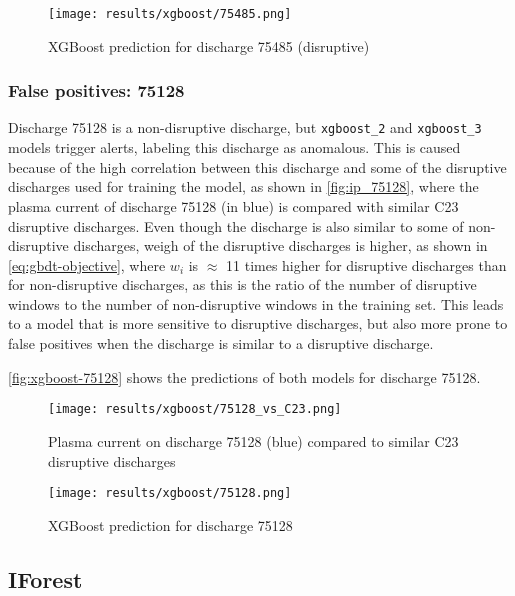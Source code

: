 \begin{figure}[H]
    \centering
    \texttt{[image: results/xgboost/75485.png]}
    \caption{XGBoost prediction for discharge 75485 (disruptive)}
    \label{fig:xgboost-75485}
\end{figure}

\subsubsection{False positives: 75128}

Discharge 75128 is a non-disruptive discharge, but \texttt{xgboost\_2} and \texttt{xgboost\_3} models trigger alerts, labeling this discharge as anomalous. This is caused because of the high correlation between this discharge and some of the disruptive discharges used for training the model, as shown in \autoref{fig:ip_75128}, where the plasma current of discharge 75128 (in blue) is compared with similar C23 disruptive discharges. Even though the discharge is also similar to some of non-disruptive discharges, weigh of the disruptive discharges is higher, as shown in \autoref{eq:gbdt-objective}, where $w_i$ is $\approx$ 11 times higher for disruptive discharges than for non-disruptive discharges, as this is the ratio of the number of disruptive windows to the number of non-disruptive windows in the training set. This leads to a model that is more sensitive to disruptive discharges, but also more prone to false positives when the discharge is similar to a disruptive discharge. 

\autoref{fig:xgboost-75128} shows the predictions of both models for discharge 75128.

\begin{figure}[H]
    \centering
    \texttt{[image: results/xgboost/75128\_vs\_C23.png]}
    \caption{Plasma current on discharge 75128 (blue) compared to similar C23 disruptive discharges}
    \label{fig:ip_75128}
\end{figure}

\begin{figure}[H]
    \centering
    \texttt{[image: results/xgboost/75128.png]}
    \caption{XGBoost prediction for discharge 75128}
    \label{fig:xgboost-75128}
\end{figure}

\subsection{IForest}

